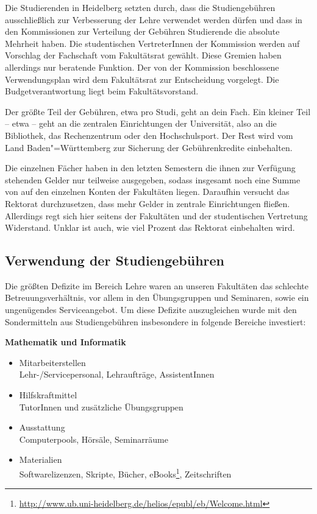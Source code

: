 Die Studierenden in Heidelberg setzten durch, dass die Studiengebühren ausschließlich
zur Verbesserung der Lehre verwendet werden dürfen und dass in den Kommissionen zur
Verteilung der Gebühren Studierende die absolute Mehrheit haben. Die studentischen
VertreterInnen der Kommission werden auf Vorschlag der Fachschaft vom Fakultätsrat
gewählt. Diese Gremien haben allerdings nur beratende Funktion. Der von der
Kommission beschlossene Verwendungsplan wird dem Fakultätsrat zur Entscheidung
vorgelegt. Die Budgetverantwortung liegt beim Fakultätsvorstand.

Der größte Teil der Gebühren, etwa  pro Studi, geht an dein Fach. Ein
kleiner Teil -- etwa  -- geht an die zentralen Einrichtungen der Universität,
also an die Bibliothek, das Rechenzentrum oder den Hochschulsport. Der Rest wird vom
Land Baden"=Württemberg zur Sicherung der Gebührenkredite einbehalten.

Die einzelnen Fächer haben in den letzten Semestern die ihnen zur Verfügung
stehenden Gelder nur teilweise ausgegeben, sodass insgesamt noch eine Summe von
 auf den einzelnen Konten der Fakultäten liegen. Daraufhin
versucht das Rektorat durchzusetzen, dass mehr Gelder in zentrale Einrichtungen
fließen. Allerdings regt sich hier seitens der Fakultäten und der studentischen
Vertretung Widerstand. Unklar ist auch, wie viel Prozent das Rektorat einbehalten
wird.


\subsection*{Verwendung der Studiengebühren}

Die größten Defizite im Bereich Lehre waren an unseren Fakultäten das schlechte
Betreuungsverhältnis, vor allem in den Übungsgruppen und Seminaren, sowie ein
ungenügendes Serviceangebot. Um diese Defizite auszugleichen wurde mit den
Sondermitteln aus Studiengebühren insbesondere in folgende Bereiche investiert:

\vspace{5mm}
\textbf{Mathematik und Informatik}
\begin{itemize}
 \item {Mitarbeiterstellen}\\Lehr-/Servicepersonal, Lehraufträge, AssistentInnen
\item {Hilfskraftmittel}\\ TutorInnen und zusätzliche Übungsgruppen
\item {Ausstattung}\\ Computerpools, Hörsäle, Seminarräume
\item {Materialien}\\ Softwarelizenzen, Skripte, Bücher, eBooks\footnote{\url{http://www.ub.uni-heidelberg.de/helios/epubl/eb/Welcome.html}}, Zeitschriften
\end{itemize}

